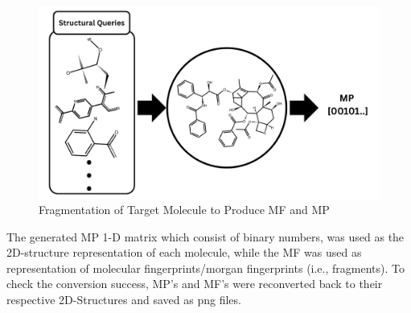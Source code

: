\begin{figure}[htbp!] %
	\centering
	\includegraphics[scale = 0.25]{Mprofile2.png}%
	\caption{Fragmentation of Target Molecule to Produce MF and MP}
	\label{fig:mpex} %
\end{figure} 

The generated MP 1-D matrix which consist of binary numbers, was used as the 2D-structure  representation of each molecule, while the MF was used as representation of molecular fingerprints/morgan fingerprints (i.e., fragments). To check the conversion success, MP's and MF's were reconverted back to their respective 2D-Structures and saved as png files.    



